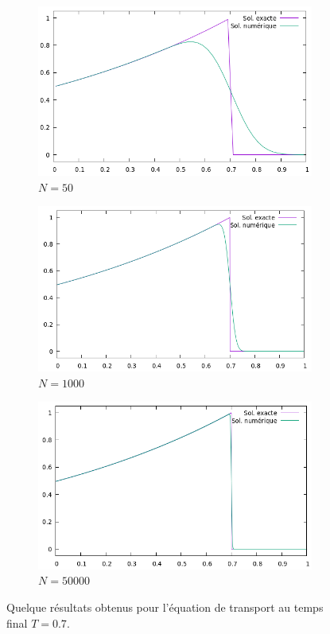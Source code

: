 \documentclass[
	french,
	11pt, %
]{fphw}
\begin{document}
\begin{figure}[h]
	\centering
	\begin{subfigure}[b]{0.45\textwidth}
		\centering
		\includegraphics[width=\textwidth]{Transport50.png}
		\caption{$N=50$}
	\end{subfigure}
	\begin{subfigure}[b]{0.45\textwidth}
		\centering
		\includegraphics[width=\textwidth]{Transport1000.png}
		\caption{$N=1000$}
		\label{fig:Transportb}
	\end{subfigure}
	\begin{subfigure}[b]{0.45\textwidth}
		\centering
		\includegraphics[width=\textwidth]{Transport50000.png}
		\caption{$N=50000$}
	\end{subfigure}
	\captionsetup{justification=centering}
	\caption{Quelque résultats obtenus pour l'équation de transport au temps final $T=0.7$.}
\end{figure}
\end{document}
